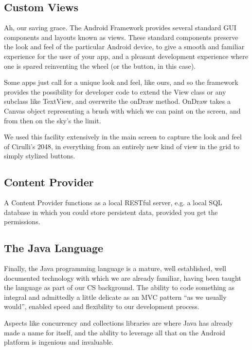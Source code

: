 \documentclass[a4paper, 12pt]{article}
\begin{document}
\subsection{Custom Views}
Ah, our saving grace. The Android Framework provides several standard
GUI components and layouts known as views. These standard components
preserve the look and feel of the particular Android device, to give a
smooth and familiar experience for the user of your app, and a
pleasant development experience where one is spared reinventing the
wheel (or the button, in this case).

Some apps just call for a unique look and feel, like ours, and so the
framework provides the possibility for developer code to extend the
View class or any subclass like TextView, and overwrite the onDraw
method. OnDraw takes a Canvas object representing a brush with which
we can paint on the screen, and from then on the sky's the limit.

We used this facility extensively in the main screen to capture the
look and feel of Cirulli's 2048, in everything from an entirely new
kind of view in the grid to simply stylized buttons.



\subsection{Content Provider}
A Content Provider functions as a local RESTful server, e.g. a local
SQL database in which you could store persistent data, provided you
get the permissions.

\subsection{The Java Language}
Finally, the Java programming language is a mature, well established,
well documented technology with which we are already familiar, having
been taught the language as part of our CS background. The ability to
code something as integral and admittedly a little delicate as an
MVC pattern ``as we usually would'', enabled speed and flexibility to
our development process.

Aspects like concurrency and collections libraries are where Java has
already made a name for itself, and the ability to leverage all that
on the Android platform is ingenious and invaluable.
\end{document}
